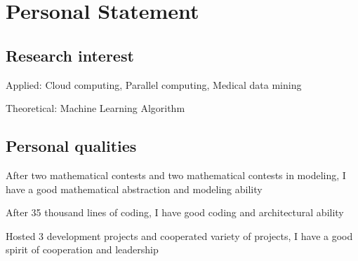 \documentclass[]{deedy-resume-openfont}
\begin{document}
\begin{minipage}[t]{0.73\textwidth}
\section{Personal Statement}
\subsection{Research interest}
    \vspace{\topsep}
	\begin{tightemize}
		\item Applied: Cloud computing, Parallel computing, Medical data mining
		\item Theoretical: Machine Learning Algorithm
	\end{tightemize}
    \subsection{Personal qualities}
    \vspace{\topsep}
    \begin{tightemize}
        \item After two mathematical contests and two mathematical contests in modeling, I have a good mathematical abstraction and modeling ability
		\item After 35 thousand lines of coding, I have good coding and architectural ability
		\item Hosted 3 development projects and cooperated variety of projects, I have a good spirit of cooperation and leadership
	\end{tightemize}

\end{minipage} 
\end{document}
